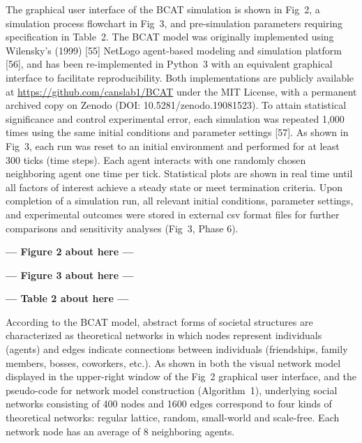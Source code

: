 \documentclass[10pt,letterpaper]{article}
\begin{document}
The graphical user interface of the BCAT simulation is shown in Fig~2, a simulation process flowchart in Fig~3, and pre-simulation parameters requiring specification in Table~2. The BCAT model was originally implemented using Wilensky's (1999) [55] NetLogo agent-based modeling and simulation platform [56], and has been re-implemented in Python~3 with an equivalent graphical interface to facilitate reproducibility. Both implementations are publicly available at \url{https://github.com/canslab1/BCAT} under the MIT License, with a permanent archived copy on Zenodo (DOI: 10.5281/zenodo.19081523). To attain statistical significance and control experimental error, each simulation was repeated 1,000 times using the same initial conditions and parameter settings [57]. As shown in Fig~3, each run was reset to an initial environment and performed for at least 300 ticks (time steps). Each agent interacts with one randomly chosen neighboring agent one time per tick. Statistical plots are shown in real time until all factors of interest achieve a steady state or meet termination criteria. Upon completion of a simulation run, all relevant initial conditions, parameter settings, and experimental outcomes were stored in external csv format files for further comparisons and sensitivity analyses (Fig~3, Phase 6).



\begin{center}\textbf{--- Figure 2 about here ---}\end{center}




\begin{center}\textbf{--- Figure 3 about here ---}\end{center}




\begin{center}\textbf{--- Table 2 about here ---}\end{center}


According to the BCAT model, abstract forms of societal structures are characterized as theoretical networks in which nodes represent individuals (agents) and edges indicate connections between individuals (friendships, family members, bosses, coworkers, etc.). As shown in both the visual network model displayed in the upper-right window of the Fig~2 graphical user interface, and the pseudo-code for network model construction (Algorithm~1), underlying social networks consisting of 400 nodes and 1600 edges correspond to four kinds of theoretical networks: regular lattice, random, small-world and scale-free. Each network node has an average of 8 neighboring agents.
\end{document}
